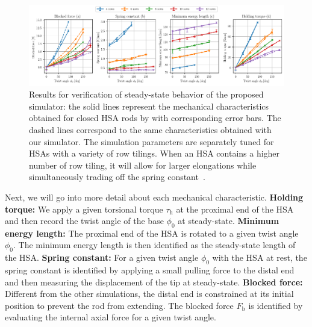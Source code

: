 \begin{figure}[hbt]
    \centering
    \includegraphics[width=\textwidth]{hsamodel/figures/simulation/closed_hsa_rods_verification_v2.pdf}
    \caption{Results for verification of steady-state behavior of the proposed simulator: the solid lines represent the mechanical characteristics obtained for closed \gls{HSA} rods by \citet{good2022expanding} with corresponding error bars. The dashed lines correspond to the same characteristics obtained with our simulator. The simulation parameters are separately tuned for HSAs with a variety of row tilings. When an HSA contains a higher number of row tiling, it will allow for larger elongations while simultaneously trading off the spring constant~\citep{good2022expanding}.}
    \label{fig:hsamodel:closed_hsa_properties_good_et_al}
\end{figure}

Next, we will go into more detail about each mechanical characteristic.
\textbf{Holding torque:} We apply a given torsional torque $\tau_\mathrm{h}$ at the proximal end of the \gls{HSA} and then record the twist angle of the base $\phi_0$ at steady-state.
\textbf{Minimum energy length:} The proximal end of the \gls{HSA} is rotated to a given twist angle $\phi_0$. The minimum energy length is then identified as the steady-state length of the \gls{HSA}.
\textbf{Spring constant:} For a given twist angle $\phi_0$ with the \gls{HSA} at rest, the spring constant is identified by applying a small pulling force to the distal end and then measuring the displacement of the tip at steady-state.
\textbf{Blocked force:} Different from the other simulations, the distal end is constrained at its initial position to prevent the rod from extending. The blocked force $F_\mathrm{b}$ is identified by evaluating the internal axial force for a given twist angle.


